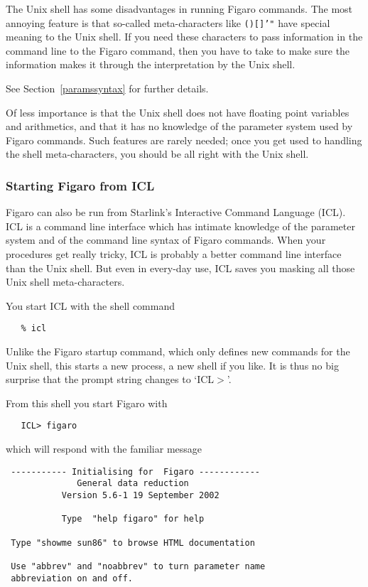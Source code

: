    The Unix shell has some disadvantages in running Figaro commands. The
   most annoying feature is that so-called meta-characters like
{\tt ()[]'"}
   have special meaning to the Unix shell. If you need these characters
   to pass information in the command line to the Figaro command, then
   you have to take
   to make sure the information makes it through the interpretation by
   the Unix shell.
\begin{latexonly}
   See Section~\ref{paramssyntax} for further details.
\end{latexonly}

   Of less importance is that the Unix shell does not have floating
   point variables and arithmetics, and that it has no knowledge of the
   parameter system used by Figaro commands. Such features are rarely
   needed; once you get used to handling the shell meta-characters,
   you should be all right with the Unix shell.

\subsubsection{Starting Figaro from ICL}

   Figaro can also be run from Starlink's Interactive Command Language
   (ICL).  ICL is a command line interface which has intimate knowledge of
   the parameter system and of the command line syntax of Figaro commands.
   When your procedures get really tricky, ICL is probably a better command
   line interface than the Unix shell.  But even in every-day use, ICL
   saves you masking all those Unix shell meta-characters.

   You start ICL with the shell command

\begin{verbatim}
   % icl
\end{verbatim}

   Unlike the Figaro startup command, which only defines new commands
   for the Unix shell, this starts a new process, a new shell if you
   like. It is thus no big surprise that the prompt string changes to
   `ICL$>$'.

   From this shell you start Figaro with

\begin{verbatim}
   ICL> figaro
\end{verbatim}

   which will respond with the familiar message

\begin{verbatim}
 ----------- Initialising for  Figaro ------------
              General data reduction
           Version 5.6-1 19 September 2002
 
           Type  "help figaro" for help
 
 Type "showme sun86" to browse HTML documentation
 
 Use "abbrev" and "noabbrev" to turn parameter name
 abbreviation on and off.
\end{verbatim}

